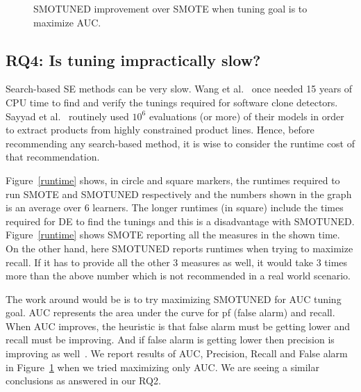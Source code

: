 \documentclass[10pt,conference]{IEEEtran}
\theoremstyle{break}
\theoremstyle{break}
\begin{document}
\begin{figure}[!htbp]
    \caption{SMOTUNED improvement over SMOTE when tuning goal is to maximize AUC.}
    \vspace{-10pt}
    \label{fig:auc}
\vspace{-0.6cm}
\end{figure} 

\subsection{\textbf{RQ4: Is tuning impractically slow?}}

Search-based SE methods can be very slow. Wang et al.~\cite{wang2013searching} once needed 15
years of CPU time to find and verify the tunings required for software
clone detectors. Sayyad et al.~\cite{sayyad2013scalable} routinely used
$10^6$ evaluations (or more) of their models in order to extract
products from highly constrained product
lines. Hence, before recommending any
search-based method, it is wise to consider the runtime cost of that
recommendation.


 Figure~\ref{runtime} shows,  in circle and square markers, the
  runtimes required to run SMOTE and SMOTUNED respectively and the numbers shown in the graph is an average over 6 learners.  The
  longer runtimes (in square) include the times required for DE to find
  the tunings and this is a disadvantage with SMOTUNED. Figure~\ref{runtime} shows SMOTE reporting all the measures in the shown time. On the other hand, here SMOTUNED reports runtimes when trying to maximize recall. If it has to provide all the other 3 measures as well, it would take 3 times more than the above number which is not recommended in a real world scenario. 
  
  The work around would be is to try maximizing SMOTUNED for AUC tuning goal. AUC represents the area under the curve for pf (false alarm) and recall. When AUC improves, the heuristic is that false alarm must be getting lower and recall must be improving. And if false alarm is getting lower then precision is improving as well~\cite{menzies2007data}. We report results of AUC, Precision, Recall and False alarm in Figure~\ref{fig:auc} when we tried maximizing only AUC. We are seeing a similar conclusions as answered in our RQ2. 
  
\end{document}
